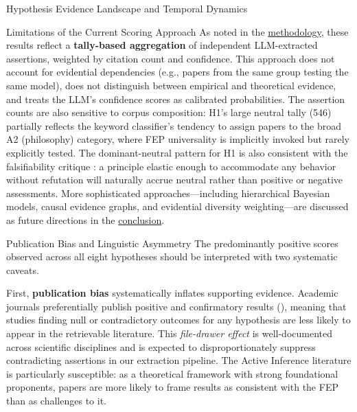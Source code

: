 \documentclass[
  ignorenonframetext,
]{beamer}
\begin{document}
\begin{frame}{Hypothesis Evidence Landscape and Temporal Dynamics
\label{sec:hypothesis_results}}
\begin{block}{Limitations of the Current Scoring Approach}
\protect{}\label{limitations-of-the-current-scoring-approach}
As noted in the \hyperref[sec:methods_kg]{methodology}, these results
reflect a \textbf{tally-based aggregation} of independent LLM-extracted
assertions, weighted by citation count and confidence. This approach
does not account for evidential dependencies (e.g., papers from the same
group testing the same model), does not distinguish between empirical
and theoretical evidence, and treats the LLM's confidence scores as
calibrated probabilities. The assertion counts are also sensitive to
corpus composition: H1's large neutral tally (546) partially reflects
the keyword classifier's tendency to assign papers to the broad A2
(philosophy) category, where FEP universality is implicitly invoked but
rarely explicitly tested. The dominant-neutral pattern for H1 is also
consistent with the falsifiability critique \citep{colombo2021free}: a
principle elastic enough to accommodate any behavior without refutation
will naturally accrue neutral rather than positive or negative
assessments. More sophisticated approaches---including hierarchical
Bayesian models, causal evidence graphs, and evidential diversity
weighting---are discussed as future directions in the
\hyperref[sec:conclusion]{conclusion}.

\begin{block}{Publication Bias and Linguistic Asymmetry
\label{sec:pub_bias}}
\protect{}\label{publication-bias-and-linguistic-asymmetry}
The predominantly positive scores observed across all eight hypotheses
should be interpreted with two systematic caveats.

First, \textbf{publication bias} systematically inflates supporting
evidence. Academic journals preferentially publish positive and
confirmatory results (\citealt{sterling1959publication}), meaning that
studies finding null or contradictory outcomes for any hypothesis are
less likely to appear in the retrievable literature. This
\textit{file-drawer effect} is well-documented across scientific
disciplines and is expected to disproportionately suppress contradicting
assertions in our extraction pipeline. The Active Inference literature
is particularly susceptible: as a theoretical framework with strong
foundational proponents, papers are more likely to frame results as
consistent with the FEP than as challenges to it.


\end{block}
\end{block}
\end{frame}
\end{document}
